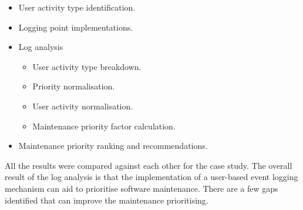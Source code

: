 \begin{itemize}
	\item User activity type identification.
	\item Logging point implementations.
	\item Log analysis
		\begin{itemize}
			\item User activity type breakdown.
			\item Priority normalisation.
			\item User activity normalisation.
			\item Maintenance priority factor calculation.
		\end{itemize}
	\item Maintenance priority ranking and recommendations. 
\end{itemize}

All the results were compared against each other for the case study. The overall result of the log analysis is that the implementation of a user-based event logging mechanism can aid to prioritise software maintenance. There are a few gaps identified that can improve the maintenance prioritising.
